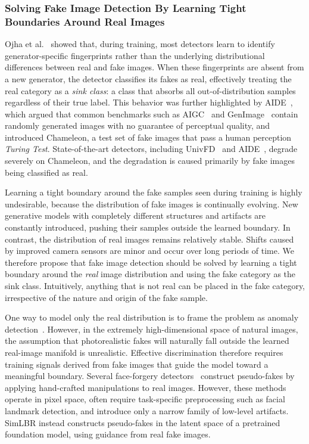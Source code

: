 \subsubsection{Solving Fake Image Detection By Learning Tight Boundaries Around Real Images}
Ojha et al.~\cite{ojha2023towards} showed that, during training, most detectors learn to identify generator-specific fingerprints rather than the underlying distributional differences between real and fake images. When these fingerprints are absent from a new generator, the detector classifies its fakes as real, effectively treating the real category as a \textit{sink class}: a class that absorbs all out-of-distribution samples regardless of their true label. This behavior was further highlighted by AIDE~\cite{yansanity}, which argued that common benchmarks such as AIGC~\cite{wang2020cnn} and GenImage~\cite{zhu2023genimage} contain randomly generated images with no guarantee of perceptual quality, and introduced Chameleon, a test set of fake images that pass a human perception \textit{Turing Test}. State-of-the-art detectors, including UnivFD~\cite{ojha2023towards} and AIDE~\cite{yansanity}, degrade severely on Chameleon, and the degradation is caused primarily by fake images being classified as real.

Learning a tight boundary around the fake samples seen during training is highly undesirable, because the distribution of fake images is continually evolving. New generative models with completely different structures and artifacts are constantly introduced, pushing their samples outside the learned boundary. In contrast, the distribution of real images remains relatively stable. Shifts caused by improved camera sensors are minor and occur over long periods of time. We therefore propose that fake image detection should be solved by learning a tight boundary around the \textit{real} image distribution and using the fake category as the sink class. Intuitively, anything that is not real can be placed in the fake category, irrespective of the nature and origin of the fake sample.

One way to model only the real distribution is to frame the problem as anomaly detection~\cite{scholkopf2001ocsvm,ruff2018deep,hendrycks2017baseline}. However, in the extremely high-dimensional space of natural images, the assumption that photorealistic fakes will naturally fall outside the learned real-image manifold is unrealistic. Effective discrimination therefore requires training signals derived from fake images that guide the model toward a meaningful boundary. Several face-forgery detectors~\cite{nguyen2024laa,Shiohara_2022_CVPR,tian2024real} construct pseudo-fakes by applying hand-crafted manipulations to real images. However, these methods operate in pixel space, often require task-specific preprocessing such as facial landmark detection, and introduce only a narrow family of low-level artifacts. SimLBR instead constructs pseudo-fakes in the latent space of a pretrained foundation model, using guidance from real fake images.


